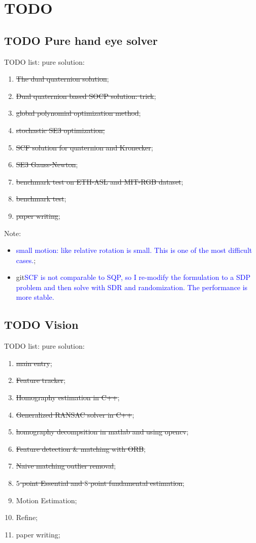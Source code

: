 \documentclass[a4paper]{report}
\begin{document}
\chapter{TODO}
\section{TODO Pure hand eye solver}
TODO list:
pure solution:
\begin{enumerate}
	\item \sout{The dual quaternion solution};
	\item \sout{Dual quaternion based SOCP solution: trick};
	\item \sout{global polynomial optimization method};
	\item \sout{stochastic SE3 optimization;}
	\item \sout{SCF solution for quaternion and Kronecker};
	\item \sout{SE3 Gauss-Newton};
	\item \sout{benchmark test on ETH-ASL and MIT-RGB dataset};
	\item \sout{benchmark test};
	\item \sout{paper writing};
\end{enumerate}
Note: 
\begin{itemize}
\item \textcolor{blue}{small motion: like relative rotation is small. This is one of the most difficult cases.};
\item git\textcolor{blue}{SCF is not comparable to SQP, so I re-modify the formulation to a SDP problem and then solve with SDR and randomization. The performance is more stable.}
\end{itemize}

\section{TODO Vision}
TODO list:
pure solution:
\begin{enumerate}
	\item \sout{main entry};
	\item \sout{Feature tracker};
	\item \sout{Homography estimation in C++};
	\item \sout{Generalized RANSAC solver in C++};
	\item \sout{homography decompsition in matlab and using opencv};
	\item \sout{Feature detection \& matching with ORB};
	\item \sout{Naive matching outlier removal};
	\item \sout{$5$ point Essential and $8$ point fundamental estimation};
	\item Motion Estimation;
	\item Refine;
	\item paper writing;
\end{enumerate}
\end{document}
